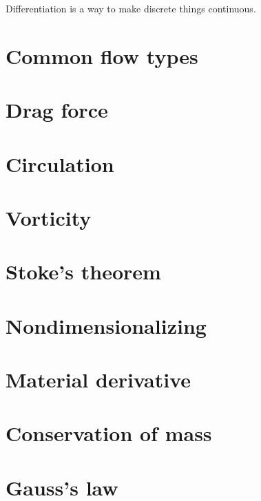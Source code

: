\documentclass[10pt]{report}
\begin{document}
Differentiation is a way to make discrete things continuous.

\chapter{Common flow types}






\chapter{Drag force}





\chapter{Circulation}



\chapter{Vorticity}



\chapter{Stoke's theorem}



\chapter{Nondimensionalizing}



\chapter{Material derivative}

\chapter{Conservation of mass}



\chapter{Gauss's law}
\end{document}
